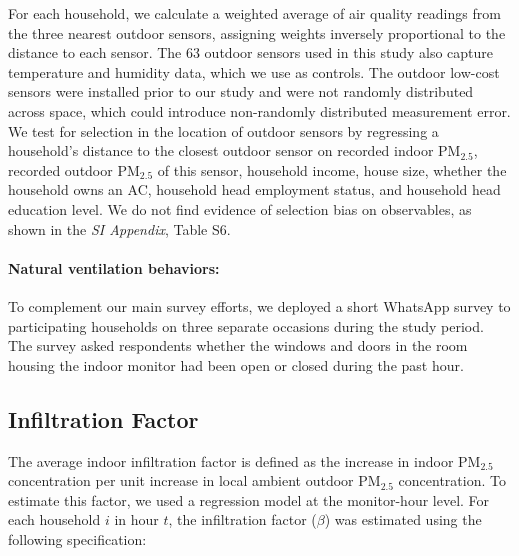 \documentclass[9pt,twocolumn,twoside]{pnas-new}
\begin{document}
For each household, we calculate a weighted average of air quality readings from the three nearest outdoor sensors, assigning weights inversely proportional to the distance to each sensor. The 63 outdoor sensors used in this study also capture temperature and humidity data, which we use as controls. The outdoor low-cost sensors were installed prior to our study and were not randomly distributed across space, which could introduce non-randomly distributed measurement error. We test for selection in the location of outdoor sensors by regressing a household's distance to the closest outdoor sensor on recorded indoor PM$_{2.5}$, recorded outdoor PM$_{2.5}$ of this sensor, household income, house size, whether the household owns an AC, household head employment status, and household head education level. We do not find evidence of selection bias on observables, as shown in the \textit{SI Appendix}, Table S6.


\paragraph{Natural ventilation behaviors:} To complement our main survey efforts, we deployed a short WhatsApp survey to participating households on three separate occasions during the study period. The survey asked respondents whether the windows and doors in the room housing the indoor monitor had been open or closed during the past hour.


\subsection{Infiltration Factor}
The average indoor infiltration factor is defined as the increase in indoor PM$_{2.5}$ concentration per unit increase in local ambient outdoor PM$_{2.5}$ concentration. To estimate this factor, we used a regression model at the monitor-hour level. For each household $i$ in hour $t$, the infiltration factor ($\beta$) was estimated using the following specification:

\end{document}
